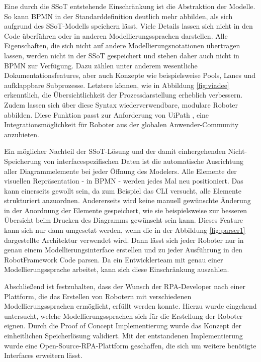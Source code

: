 \clearpage

Eine durch die SSoT entstehende Einschränkung ist die Abstraktion der Modelle. So kann BPMN in der Standarddefinition deutlich mehr abbilden, als sich aufgrund des SSoT-Modells speichern lässt. Viele Details lassen sich nicht in den Code überführen oder in anderen Modellierungssprachen darstellen. Alle Eigenschaften, die sich nicht auf andere Modellierungsnotationen übertragen lassen, werden nicht in der SSoT gespeichert und stehen daher auch nicht in BPMN zur Verfügung.
Dazu zählen unter anderem wesentliche Dokumentationsfeatures, aber auch Konzepte wie beispielsweise Pools, Lanes und aufklappbare Subprozesse. Letztere können, wie in Abbildung \ref{fig:viadee} erkenntlich, die Übersichtlichkeit der Prozessdarstellung erheblich verbessern. Zudem lassen sich über diese Syntax wiederverwendbare, modulare Roboter abbilden. Diese Funktion passt zur Anforderung von UiPath \cite{uiPathReq}, eine Integrationsmöglichkeit für Roboter aus der \glqq globalen Anwender-Community\grqq{} anzubieten.

Ein möglicher Nachteil der SSoT-Lösung und der damit einhergehenden Nicht-Speicherung von interfacespezifischen Daten ist die automatische Ausrichtung aller Diagrammelemente bei jeder Öffnung des Modelers. Alle Elemente der visuellen Repräsentation - in BPMN - werden jedes Mal neu positioniert. Das kann einerseits gewollt sein, da zum Beispiel das  CLI versucht, alle Elemente strukturiert anzuordnen. Andererseits wird keine manuell gewünschte Änderung in der Anordnung der Elemente gespeichert, wie sie beispielsweise zur besseren Übersicht beim Drucken des Diagramms gewünscht sein kann. Dieses Feature kann sich nur dann umgesetzt werden, wenn die in der Abbildung \ref{fig:parser1} dargestellte Architektur verwendet wird. Dann lässt sich jeder Roboter nur in genau einem Modellierungsinterface erstellen und zu jeder Ausführung in den RobotFramework Code parsen. Da ein Entwicklerteam mit genau einer Modellierungssprache arbeitet, kann sich diese Einschränkung auszahlen.  

Abschließend ist festzuhalten, dass der Wunsch der RPA-Developer nach einer Plattform, die das Erstellen von Robotern mit verschiedenen Modellierungssprachen ermöglicht, erfüllt werden konnte. Hierzu wurde eingehend untersucht, welche Modellierungssprachen sich für die Erstellung der Roboter eignen. Durch die Proof of Concept Implementierung wurde das Konzept der einheitlichen Speicherlösung validiert. Mit der entstandenen Implementierung wurde eine Open-Source-RPA-Plattform geschaffen, die sich um weitere benötigte Interfaces erweitern lässt.